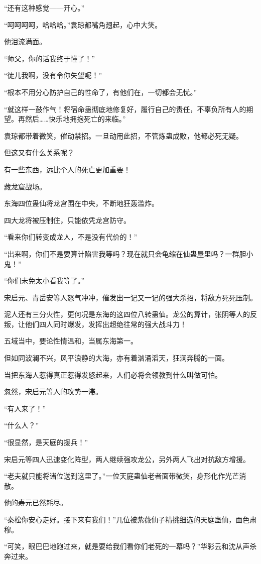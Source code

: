 \begin{this_body}
“还有这种感觉——开心。”

“呵呵呵呵，哈哈哈。”袁琼都嘴角翘起，心中大笑。

他泪流满面。

“师父，你的话我终于懂了！”

“徒儿我啊，没有令你失望呢！”

“根本不用分心防护自己的性命了，有他们在，一切都会无忧。”

“就这样一鼓作气！将宿命蛊彻底地修复好，履行自己的责任，不辜负所有人的期望。再然后……快乐地拥抱死亡的来临。”

袁琼都带着微笑，催动禁招。一旦动用此招，不管炼蛊成败，他都必死无疑。

但这又有什么关系呢？

有一些东西，远比个人的死亡更加重要！

藏龙窟战场。

东海四位蛊仙将龙宫围在中央，不断地狂轰滥炸。

四大龙将被压制住，只能依凭龙宫防守。

“看来你们转变成龙人，不是没有代价的！”

“出来啊，你们不是要算计陷害我等吗？现在就只会龟缩在仙蛊屋里吗？一群胆小鬼！”

“你们未免太小看我等了。”

宋启元、青岳安等人怒气冲冲，催发出一记又一记的强大杀招，将敌方死死压制。

泥人还有三分火性，更何况是东海的这四位八转蛊仙。龙公的算计，张阴等人的反叛，让他们四人同时爆发，发挥出超绝往常的强大战斗力！

五域当中，要论性情温和，当属东海第一。

但如同波澜不兴，风平浪静的大海，亦有着汹涌滔天，狂澜奔腾的一面。

当把东海人惹得真正惹得发怒起来，人们必将会领教到什么叫做可怕。

忽然，宋启元等人的攻势一滞。

“有人来了！”

“什么人？”

“很显然，是天庭的援兵！”

宋启元等四人迅速变化阵型，两人继续强攻龙公，另外两人飞出对抗敌方增援。

“老夫就只能将诸位送到这里了。”一位天庭蛊仙老者面带微笑，身形化作光芒消散。

他的寿元已然耗尽。

“秦松你安心走好。接下来有我们！”几位被紫薇仙子精挑细选的天庭蛊仙，面色肃穆。

“可笑，眼巴巴地跑过来，就是要给我们看你们老死的一幕吗？”华彩云和沈从声杀奔过来。


\end{this_body}
